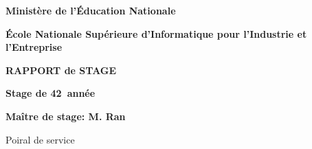 
\makeatletter
\thispagestyle{empty}

\begin{center}
	\noindent \textbf{Ministère de l'Éducation Nationale}
	\vspace{0.8cm}

	\noindent \textbf{École Nationale Supérieure d'Informatique pour l'Industrie et l'Entreprise}

	\vspace{4.0cm}

	\noindent \LARGE{\textbf{RAPPORT de STAGE}}

	\vspace{1.0cm}

	\noindent \LARGE{\@title}

	\vspace{5.0cm}

	\noindent \normalsize{\@author}

	\noindent \textbf{Stage de 42\ieme\ année}

	\vspace{2.5cm}

	\noindent \textbf{Maître de stage: M. Ran }

	\noindent Poiral de service

	\vspace{1.6cm}

\end{center}

\makeatother

\pagebreak
\thispagestyle{empty}


